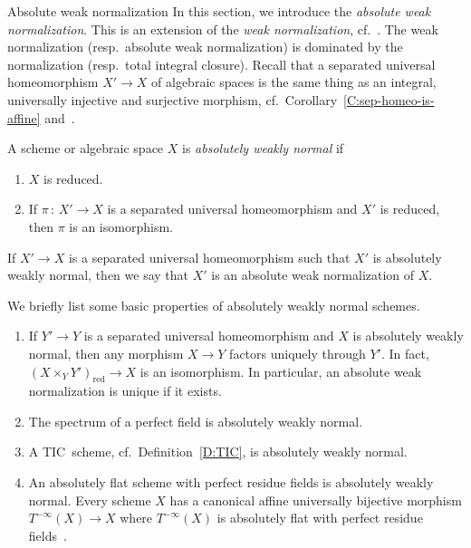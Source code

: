 \documentclass[a4paper,twoside,11pt]{amsart}[2009/07/02] %
\newcommand{\pref}[1]{\eqref{#1}}
\newcommand{\map}[3]{#1\,:\, #2\rightarrow #3}
\newcommand{\red}{\mathrm{red}}
\begin{document}
\begin{section}{Absolute weak normalization}\label{S:weak-norm}
In this section, we introduce the \emph{absolute weak normalization}. This is
an extension of the \emph{weak normalization},
cf.~\cite{and-bom,manaresi,yanagihara_1}. The weak normalization (resp.\ 
absolute weak normalization) is dominated by the normalization (resp.\ total
integral closure). Recall that a separated universal homeomorphism $X'\to X$ of
algebraic spaces is the same thing as an integral, universally injective and
surjective morphism, cf.\ Corollary~\pref{C:sep-homeo-is-affine}
and~\cite[Cor.~18.12.11]{egaIV}.

\begin{definition}
A scheme or algebraic space $X$ is \emph{absolutely weakly normal} if
%
\begin{enumerate}
\item $X$ is reduced.
\item If $\map{\pi}{X'}{X}$ is a separated universal homeomorphism and
$X'$ is reduced, then $\pi$ is an isomorphism.
\end{enumerate}
%
If $X'\to X$ is a separated universal homeomorphism such that $X'$ is
absolutely weakly normal, then we say that $X'$ is an absolute weak
normalization of $X$.
\end{definition}

\begin{properties}\label{X:AWN}
We briefly list some basic properties of absolutely weakly normal schemes.
%
\begin{enumerate}
\item If $Y'\to Y$ is a separated universal homeomorphism and $X$ is absolutely
weakly normal, then any morphism $X\to Y$ factors uniquely through $Y'$. In
fact, ${(X\times_Y Y')_\red} \to X$ is an isomorphism. In particular, an
absolute weak normalization is unique if it exists.
\item The spectrum of a perfect field is absolutely weakly normal.
\item A TIC~scheme, cf.\ Definition~\pref{D:TIC}, is absolutely weakly
normal.
\item An absolutely flat scheme with perfect residue fields is absolutely
weakly normal. Every scheme $X$ has a canonical affine universally bijective
morphism $T^{-\infty}(X)\to X$ where $T^{-\infty}(X)$ is absolutely flat with
perfect residue fields~\cite{olivier_sem_samuel-2}.
\end{enumerate}
%
\end{properties}


\end{section}
\end{document}
